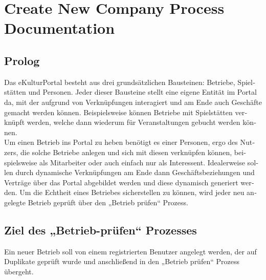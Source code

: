 
\chapter{Create New Company Process Documentation}
\label{app:C}
\begin{otherlanguage}{german}
\section*{Prolog}
Das eKulturPortal besteht aus drei grundsätzlichen Bausteinen: Betriebe, Spiel\-stätten und Personen. Jeder dieser Bausteine stellt eine eigene Entität im Portal da, mit der aufgrund von Verknüpfungen interagiert und am Ende auch Geschäfte gemacht werden können. Beispielsweise können Betriebe mit Spielstätten verknüpft werden, welche dann wiederum für Veranstaltungen gebucht werden können. \\
Um einen Betrieb ins Portal zu heben benötigt es einer Personen, ergo des Nutzers, die solche Betriebe anlegen und sich mit diesen verknüpfen können, beispielsweise als Mitarbeiter oder auch einfach nur als Interessent. Idealerweise sollen durch dynamische Verknüpfungen am Ende dann Geschäftsbeziehungen und Verträge über das Portal abgebildet werden und diese dynamisch generiert werden. Um die Echtheit eines Betriebes sicherstellen zu können, wird jeder neu angelegte Betrieb geprüft über den „Betrieb prüfen“ Prozess. 

\section*{Ziel des „Betrieb-prüfen“ Prozesses}
Ein neuer Betrieb soll von einem registrierten Benutzer angelegt werden, der auf Duplikate geprüft wurde und anschließend in den „Betrieb prüfen“ Prozess über\-geht. 



\end{otherlanguage}
